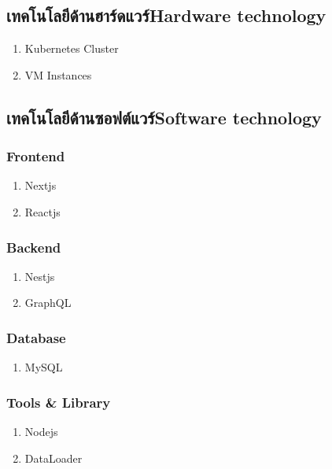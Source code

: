 \subsection{\ifcpe เทคโนโลยีด้านฮาร์ดแวร์\else Hardware technology\fi}
\begin{enumerate}
    \item Kubernetes Cluster
    \item VM Instances
\end{enumerate}

\subsection{\ifcpe เทคโนโลยีด้านซอฟต์แวร์\else Software technology\fi}
\subsubsection{Frontend}
\begin{enumerate}
    \item Nextjs \cite{nextjs}
    \item Reactjs \cite{reactjs}
\end{enumerate}

\subsubsection{Backend}
\begin{enumerate}
    \item Nestjs \cite {nestjs}
    \item GraphQL \cite {graphql}
\end{enumerate}

\subsubsection{Database}
\begin{enumerate}
    \item MySQL \cite {mysql}
\end{enumerate}

\subsubsection{Tools \& Library}
\begin{enumerate}
    \item Nodejs \cite {nodejs}
    \item DataLoader \cite {dataloader}
\end{enumerate}

